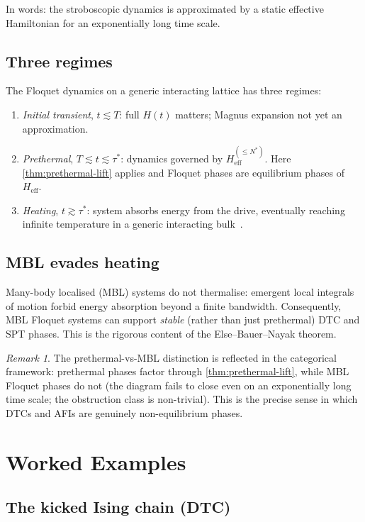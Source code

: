 \documentclass[12pt]{article}
\theoremstyle{definition}
\theoremstyle{remark}
\newtheorem{remark}[theorem]{Remark}
\newcommand{\Heff}{H_{\mathrm{eff}}}
\begin{document}
In words: the stroboscopic dynamics is approximated by a static effective Hamiltonian for an exponentially long time scale.

\subsection{Three regimes}

The Floquet dynamics on a generic interacting lattice has three regimes:
\begin{enumerate}
\item \emph{Initial transient}, $t\lesssim T$: full $H(t)$ matters; Magnus expansion not yet an approximation.
\item \emph{Prethermal}, $T\lesssim t\lesssim\tau^*$: dynamics governed by $\Heff^{(\leq N^*)}$. Here \cref{thm:prethermal-lift} applies and Floquet phases are equilibrium phases of $\Heff$.
\item \emph{Heating}, $t\gtrsim\tau^*$: system absorbs energy from the drive, eventually reaching infinite temperature in a generic interacting bulk~\cite{lazarides2014,dalessio2014}.
\end{enumerate}

\subsection{MBL evades heating}

Many-body localised (MBL) systems do not thermalise: emergent local integrals of motion forbid energy absorption beyond a finite bandwidth. Consequently, MBL Floquet systems can support \emph{stable} (rather than just prethermal) DTC and SPT phases. This is the rigorous content of the Else--Bauer--Nayak theorem.

\begin{remark}
The prethermal-vs-MBL distinction is reflected in the categorical framework: prethermal phases factor through \cref{thm:prethermal-lift}, while MBL Floquet phases do not (the diagram fails to close even on an exponentially long time scale; the obstruction class is non-trivial). This is the precise sense in which DTCs and AFIs are genuinely non-equilibrium phases.
\end{remark}

\section{Worked Examples}
\label{sec:examples}

\subsection{The kicked Ising chain (DTC)}
\end{document}
